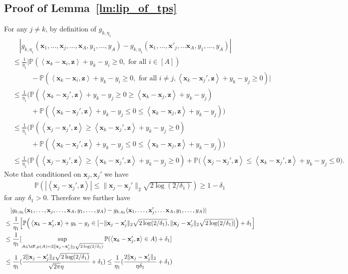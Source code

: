 \documentclass[10pt]{article}
\newcommand{\<}{\left\langle}
\renewcommand{\>}{\right\rangle}
\renewcommand{\P}{\mathbb{P}}
\newcommand{\trunprob}{{\eta_1}}
\newcommand{\Trunregp}{{\eta}}
\def\bx{{\mathbf x}}
\def\bz{{\mathbf z}}
\begin{document}
\subsection{Proof of Lemma~\ref{lm:lip_of_tps}}\label{sec:pf_lm:lip_of_tps}

For any $j\neq k$, by definition of $g_{k,\trunprob}$
\begin{align*}
     &\quad|g_{k,\trunprob}(\bx_1,\ldots,\bx_j,\ldots,\bx_A,y_1,\ldots,y_A)-g_{k,\trunprob}(\bx_1,\ldots,\bx'_j,\ldots\bx_A,y_1,\ldots,y_A)|
        \\
     &\leq
     \frac{1}{\trunprob}\Big|\P(\<\bx_k-\bx_i,\bz\>+y_k-y_i\geq0,\text{~for all~}i\in[A])\\
     &\qquad~~~ -\P(\<\bx_k-\bx_i,\bz\>+y_k-y_i\geq0,\text{~for all~}i\neq j, \<\bx_k-\bx_j',\bz\>+y_k-y_j\geq0)\Big|
     \\
      &\leq
     \frac{1}{\trunprob}\Big(\P( \<\bx_k-\bx_j',\bz\>+y_k-y_j\geq0\geq\<\bx_k-\bx_j,\bz\>+y_k-y_j )\\
     &\qquad~~~
     +\P( \<\bx_k-\bx_j',\bz\>+y_k-y_j\leq0\leq\<\bx_k-\bx_j,\bz\>+y_k-y_j)\Big)\\
     &\leq 
      \frac{1}{\trunprob}\Big(\P(\<\bx_j-\bx_j',\bz\>\geq\<\bx_k-\bx_j',\bz\>+y_k-y_j\geq0 )\\&\qquad~~~+\P( \<\bx_k-\bx_j',\bz\>+y_k-y_j\leq0\leq\<\bx_k-\bx_j,\bz\>+y_k-y_j)\Big)\\
       &\leq 
      \frac{1}{\trunprob}\Big(\P(\<\bx_j-\bx_j',\bz\>\geq\<\bx_k-\bx_j',\bz\>+y_k-y_j\geq0 )+\P(\<\bx_j-\bx_j',\bz\>\leq \<\bx_k-\bx_j',\bz\>+y_k-y_j\leq0\Big).   
\end{align*}
Note that conditioned on $\bx_j,\bx_j'$ we have
\begin{align*}
    \P(|\<\bx_j-\bx_j',\bz\>|\leq \|\bx_j-\bx_j'\|_2\sqrt{2\log(2/{\delta_1})})\geq 1-{\delta_1}
\end{align*} for any ${\delta_1}>0$. Therefore we further have
\begin{align*}
    &\quad|g_{k,\trunprob}(\bx_1,\ldots,\bx_j,\ldots,\bx_A,y_1,\ldots,y_A)-g_{k,\trunprob}(\bx_1,\ldots,\bx'_j,\ldots\bx_A,y_1,\ldots,y_A)|
    \\
    &\leq
     \frac{1}{\trunprob}\Big[\P\Big(\<\bx_k-\bx_j',\bz\>+y_k-y_j\in[-\|\bx_j-\bx_j'\|_2\sqrt{2\log(2/{\delta_1})},\|\bx_j-\bx_j'\|_2\sqrt{2\log(2/{\delta_1})}] \Big)+{\delta_1}\Big]\\
     &\leq 
    \frac{1}{\trunprob}[\sup_{A\in\cF,\mu(A)=2\|\bx_j-\bx_j'\|_2\sqrt{2\log(2/{\delta_1})}}\P(\<\bx_k-\bx_j',\bz\>\in A)+{\delta_1}]\\
    &\leq 
   \frac{1}{\trunprob}(\frac{2\|\bx_j-\bx_j'\|_2\sqrt{2\log(2/{\delta_1})}}{\sqrt{2\pi}\Trunregp}+{\delta_1})\leq \frac{1}{\trunprob}(\frac{2\|\bx_j-\bx_j'\|_2}{\Trunregp{\delta_1}}+{\delta_1})
\end{align*}
\end{document}
